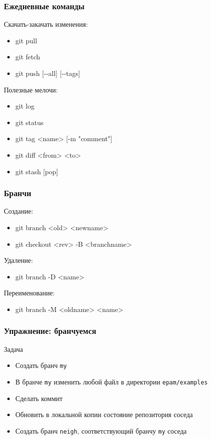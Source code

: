 \begin{frame}[fragile]
	\frametitle{Ежедневные команды}

	Скачать-закачать изменения:
	\begin{itemize}
		\item git pull
		\item git fetch
		\item git push [-{}-all] [-{}-tags]
	\end{itemize}

	Полезные мелочи:
	\begin{itemize}
		\item git log
		\item git status
		\item git tag <name> [-m "comment"]
		\item git diff <from> <to>
		\item git stash [pop]
	\end{itemize}

\end{frame}

\begin{frame}[fragile]
	\frametitle{Бранчи}

	Создание:

	\begin{itemize}
		\item git branch <old> <newname>
		\item git checkout <rev> -B <branchname> 
	\end{itemize}

	Удаление:

	\begin{itemize}
		\item git branch -D <name>
	\end{itemize}

	Переименование:

	\begin{itemize}
		\item git branch -M <oldname> <name>
	\end{itemize}

\end{frame}


\begin{frame}[fragile]
	\frametitle{Упражнение: бранчуемся}


	\begin{block}{Задача}
		\begin{itemize}
			\item Создать бранч {\tt my}
			\item В бранче {\tt my} изменить любой файл в директории {\tt epam/examples}
			\item Сделать коммит
			\item Обновить в локальной копии состояние репозитория соседа
			\item Создать бранч {\tt neigh}, соответствующий бранчу {\tt my} соседа
		\end{itemize}
	\end{block}

\end{frame}


